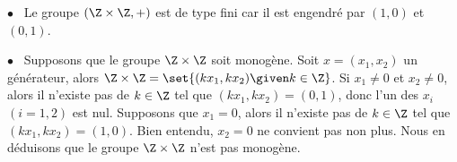 $\bullet$~ Le groupe $(\Z \times \Z,+)$ est de type fini car il est engendré par $(1,0)$ et $(0,1)$.

$\bullet$~ Supposons que le groupe $\Z \times \Z$ soit monogène. Soit $x = (x_1,x_2)$ un
générateur, alors $\Z \times \Z = \set{(kx_1,kx_2) \given k \in \Z}$.
Si $x_1\neq 0$ et $x_2\neq 0$, alors il n'existe pas de $k\in\Z$ tel que
$(kx_1,kx_2) = (0,1)$, donc l'un des $x_i$ $(i=1,2)$ est nul. Supposons
que $x_1 = 0$, alors il n'existe pas de $k\in\Z$ tel que $(kx_1,kx_2) = (1,0)$.
Bien entendu, $x_2 = 0$ ne convient pas non plus. 
Nous en déduisons que le groupe $\Z \times \Z$ n'est pas monogène.

